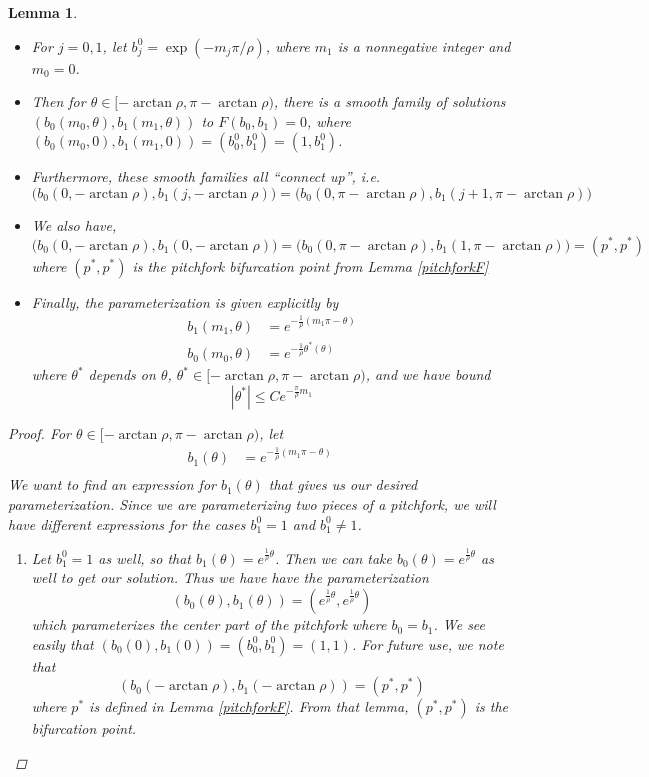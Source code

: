 \documentclass[12pt]{article}
\newtheorem{lemma}{Lemma}
\begin{document}
\begin{lemma}\label{thetaparam2}\[\]
\begin{itemize}
\item For $j = 0, 1$, let $b_j^0 = \exp(-m_j \pi / \rho )$, where $m_1$ is a nonnegative integer and $m_0 = 0$. 
\item Then for $\theta \in [-\arctan \rho,\pi - \arctan \rho)$, there is a smooth family of solutions $( b_0(m_0, \theta), b_1(m_1, \theta) )$ to $F(b_0, b_1) = 0$, where $(b_0(m_0, 0), b_1(m_1, 0)) = (b_0^0, b_1^0) = (1, b_1^0)$. 
\item Furthermore, these smooth families all ``connect up'', i.e.
\[
\Big( b_0(0, -\arctan \rho), b_1(j, -\arctan \rho) \Big) = \Big( b_0(0, \pi - \arctan \rho), b_1(j+1, \pi - \arctan \rho) \Big)
\]
\item We also have,
\[
\Big( b_0(0, -\arctan \rho), b_1(0, -\arctan \rho) \Big) = \Big( b_0(0, \pi - \arctan \rho), b_1(1, \pi - \arctan \rho) \Big) = (p^*, p^*)
\] 
where $(p^*, p^*)$ is the pitchfork bifurcation point from Lemma \ref{pitchforkF}
\item Finally, the parameterization is given explicitly by
\begin{align*}
b_1(m_1, \theta) &= e^{ -\frac{1}{\rho}(m_1 \pi - \theta) } \\
b_0(m_0, \theta) &= e^{-\frac{1}{\rho} \theta^*(\theta) }
\end{align*}
where $\theta^*$ depends on $\theta$, $\theta^* \in [-\arctan \rho,\pi - \arctan \rho)$, and we have bound
\[
|\theta^*| \leq C e^{ -\frac{\pi}{\rho} m_1 }
\]
\end{itemize}

\begin{proof}
For $\theta \in [-\arctan \rho,\pi - \arctan \rho)$, let
\begin{align*}
b_1(\theta) &= e^{ -\frac{1}{\rho}(m_1 \pi - \theta) } \\
\end{align*}
We want to find an expression for $b_1(\theta)$ that gives us our desired parameterization. Since we are parameterizing two pieces of a pitchfork, we will have different expressions for the cases $b_1^0 = 1$ and $b_1^0 \neq 1$. 
\begin{enumerate}
	\item Let $b_1^0 = 1$ as well, so that $b_1(\theta) = e^{ \frac{1}{\rho}\theta }$. Then we can take $b_0(\theta) = e^{ \frac{1}{\rho}\theta }$ as well to get our solution. Thus we have have the parameterization
	\[
	( b_0(\theta), b_1(\theta) ) = ( e^{ \frac{1}{\rho}\theta }, e^{ \frac{1}{\rho}\theta })
	\]
	which parameterizes the center part of the pitchfork where $b_0 = b_1$. We see easily that $(b_0(0), b_1(0)) = (b_0^0, b_1^0) = (1,1)$. For future use, we note that
	\[
	(b_0(-\arctan \rho), b_1(-\arctan \rho)) = (p^*, p^*)
	\]
	where $p^*$ is defined in Lemma \ref{pitchforkF}. From that lemma, $(p^*, p^*)$ is the bifurcation point.


\end{enumerate}
\end{proof}
\end{lemma}
\end{document}
